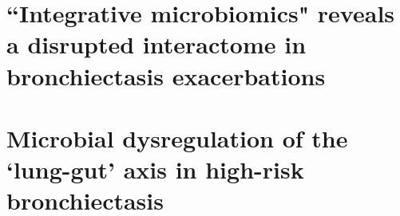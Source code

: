 \documentclass[10pt,a4paper]{report}
\begin{document}

\tableofcontents
\newpage
\listoffigures
\newpage
\listoftables
\newpage
\setcounter{page}{1}


\newpage
\chapter{``Integrative microbiomics" reveals a disrupted interactome in bronchiectasis exacerbations}





\newpage
\chapter{Microbial dysregulation of the `lung-gut' axis in high-risk bronchiectasis}



\newpage

\newpage



\newpage


\end{document}
